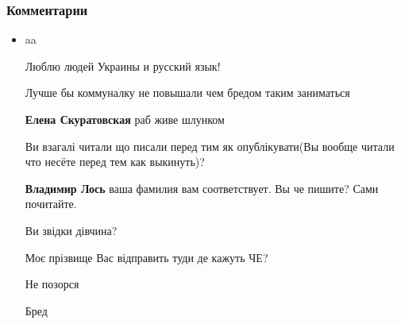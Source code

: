  
 
 
 
 
\clearpage
\subsubsection{Комментарии}
\label{sec:18_06_2020.fb.zharkih_ekaterina.1.mova_jazyk.cmt}

\begin{itemize}
\item aa

Люблю людей Украины и русский язык!

Лучше бы коммуналку не повышали чем бредом таким заниматься

\textbf{Елена Скуратовская} раб живе шлунком


Ви взагалі читали що писали перед тим як опублікувати(Вы вообще читали что
несёте перед тем как выкинуть)?

\begin{itemize}
\textbf{Владимир Лось} ваша фамилия вам соответствует. Вы че пишите? Сами почитайте.

Ви звідки дівчина?

Моє прізвище Вас відправить туди де кажуть ЧЕ?

Не позорся
\end{itemize}

Бред

\end{itemize}


